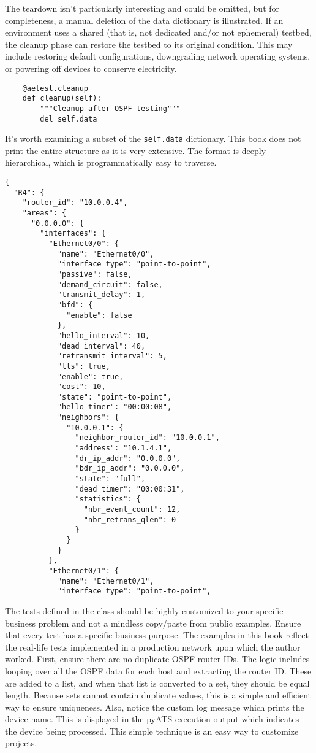 The teardown isn't particularly interesting and could be omitted, but for
completeness, a manual deletion of the data dictionary is illustrated. If
an environment uses a shared (that is, not dedicated and/or not ephemeral)
testbed, the cleanup phase can restore the testbed to its original condition.
This may include restoring default configurations, downgrading network
operating systems, or powering off devices to conserve electricity.

\begin{verbatim}
    @aetest.cleanup
    def cleanup(self):
        """Cleanup after OSPF testing"""
        del self.data
\end{verbatim}

It's worth examining a subset of the \verb|self.data| dictionary. This book
does not print the entire structure as it is very extensive. The format is
deeply hierarchical, which is programmatically easy to traverse.

\begin{verbatim}
{
  "R4": {
    "router_id": "10.0.0.4",
    "areas": {
      "0.0.0.0": {
        "interfaces": {
          "Ethernet0/0": {
            "name": "Ethernet0/0",
            "interface_type": "point-to-point",
            "passive": false,
            "demand_circuit": false,
            "transmit_delay": 1,
            "bfd": {
              "enable": false
            },
            "hello_interval": 10,
            "dead_interval": 40,
            "retransmit_interval": 5,
            "lls": true,
            "enable": true,
            "cost": 10,
            "state": "point-to-point",
            "hello_timer": "00:00:08",
            "neighbors": {
              "10.0.0.1": {
                "neighbor_router_id": "10.0.0.1",
                "address": "10.1.4.1",
                "dr_ip_addr": "0.0.0.0",
                "bdr_ip_addr": "0.0.0.0",
                "state": "full",
                "dead_timer": "00:00:31",
                "statistics": {
                  "nbr_event_count": 12,
                  "nbr_retrans_qlen": 0
                }
              }
            }
          },
          "Ethernet0/1": {
            "name": "Ethernet0/1",
            "interface_type": "point-to-point",
\end{verbatim}

The tests defined in the class should be highly customized to your specific
business problem and not a mindless copy/paste from public examples. Ensure
that every test has a specific business purpose. The examples in this book
reflect the real-life tests implemented in a production network upon which
the author worked. First, ensure there are no duplicate OSPF router IDs. The
logic includes looping over all the OSPF data for each host and extracting
the router ID\@. These are added to a list, and when that list is converted to
a set, they should be equal length. Because sets cannot contain duplicate
values, this is a simple and efficient way to ensure uniqueness. Also,
notice the custom log message which prints the device name. This
is displayed in the pyATS execution output which indicates the device
being processed. This simple technique is an easy way to customize projects.


